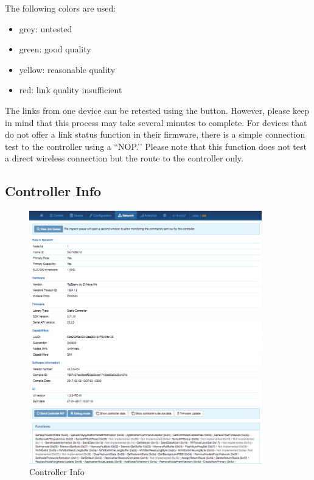 The following colors are used:

\begin{itemize}
\item grey: untested
\item green: good quality
\item yellow: reasonable quality
\item red: link quality insufficient
\end{itemize}

The links from one device can be retested using the  button. However, please 
keep in mind that this process may take several minutes to complete.
For devices that do not offer a link status function in their firmware, there is a simple 
connection test to the \zway controller using a ``NOP.’’ Please note that this function 
does not test a direct wireless connection but the route to the controller only.

\subsection{Controller Info}

\begin{figure}
\begin{center}
\includegraphics[width=0.9\textwidth]{pngs/cap7/eui27.png}
\caption{Controller Info}
\label{eui27}
\end{center}
\end{figure}

